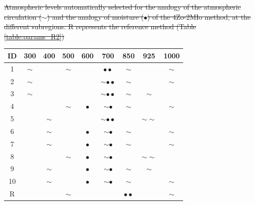 \documentclass[review]{elsarticle}
\providecommand{\DIFdeltex}[1]{{\protect\color{red}\sout{#1}}}                      %
\providecommand{\DIFdelFL}[1]{\DIFdel{#1}} %
\providecommand{\DIFdelendFL}{} %
\providecommand{\DIFdel}[1]{\texorpdfstring{\DIFdeltex{#1}}{}} %
\begin{document}
\begin{table}[t]
\begin{center}
			{%
				\DIFdelFL{Atmospheric levels automatically selected for the analogy of the atmospheric circulation ($\sim$) and the analogy of moisture ($\bullet$) of the 4Zo-2MIo method, at the different subregions.  R represents the reference method (Table \ref{table:params_R2})}}
			\DIFdelendFL \begin{tabular}{ccccccccc}
				\hline ID & 300 & 400 & 500 & 600 & 700 & 850 & 925 & 1000 \\ 
				\hline 
				1  & $\sim$ &   & $\sim$ &   & $\bullet \bullet$  & $\sim$ &   & $\sim$ \\
				2  & $\sim$ &   &   &   & $\sim \bullet \bullet$ & $\sim$ &   & $\sim$ \\
				3  & $\sim$ &   &   &   & $\sim \bullet \bullet$ & $\sim$ & $\sim$ &   \\
				4  &   &   & $\sim$ & $\bullet$ & $\sim \bullet$ & $\sim$ &   & $\sim$ \\
				5  &   & $\sim$ &   &   & $\sim \bullet \bullet$ &   & $\sim \sim$ &   \\
				6  &   & $\sim$ &   & $\bullet$ & $\sim \bullet$ & $\sim$ &   & $\sim$ \\
				7  &   & $\sim$ &   & $\bullet$ & $\sim \bullet$ & $\sim$ &   & $\sim$ \\
				8  &   &   & $\sim$ & $\bullet$ & $\sim \bullet$ &   & $\sim \sim$ &   \\
				9  &   & $\sim$ &   & $\bullet$ & $\sim \bullet$ & $\sim$ & $\sim$ &   \\
				10 &   & $\sim$ &   & $\bullet$ & $\sim \bullet$ & $\sim$ &   & $\sim$ \\
				\hline 
				R &   &   & $\sim$ &   &   & $\bullet \bullet$ &   & $\sim$ \\
				\hline 
			\end{tabular} 
		\end{center}
		\label{table:levels_GA_4Zo_2MIo}
	\end{table}
	
\end{document}
